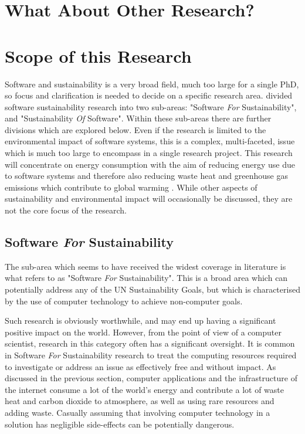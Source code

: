 \section{What About Other Research?}
\label{section:literature}

\section{Scope of this Research}
\label{section:literature scope}

Software and sustainability is a very broad field, much too large for a single PhD, so focus and clarification is needed to decide on a specific research area.  \cite{Penzenstadler2013} divided software sustainability research into two sub-areas: "Software \emph{For} Sustainability", and "Sustainability \emph{Of} Software". Within these sub-areas there are further divisions which are explored below. Even if the research is limited to the environmental impact of software systems, this is a complex, multi-faceted, issue which is much too large to encompass in a single research project. This research will concentrate on energy consumption with the aim of reducing energy use due to software systems and therefore also reducing waste heat and greenhouse gas emissions which contribute to global warming . While other aspects of sustainability and environmental impact will occasionally be discussed, they are not the core focus of the research.

\subsection{Software \emph{For} Sustainability}

The sub-area which seems to have received the widest coverage in literature is what  \cite{Penzenstadler2013} refers to as "Software \emph{For} Sustainability". This is a broad area which can potentially address any of the UN Sustainability Goals, but which is characterised by the use of computer technology to achieve non-computer goals.

\citep{Knowles2022}
\citep{Gwaka2022}

Such research is obviously worthwhile, and may end up having a significant positive impact on the world. However, from the point of view of a computer scientist, research in this category often has a significant oversight. It is common in Software \emph{For} Sustainability research to treat the computing resources required to investigate or address an issue as effectively free and without impact. As discussed in the previous section, computer applications and the infrastructure of the internet consume a lot of the world's energy and contribute a lot of waste heat and carbon dioxide to atmosphere, as well as using rare resources and adding waste. Casually assuming that involving computer technology in a solution has negligible side-effects can be potentially dangerous.

